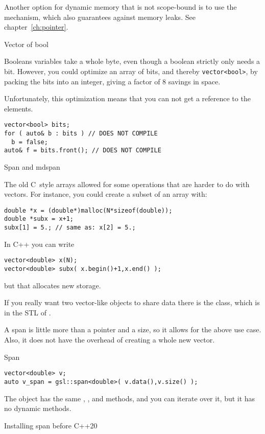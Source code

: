 Another option for dynamic memory that is not scope-bound
is to use the  mechanism,
which also guarantees against memory leaks. See chapter~\ref{ch:pointer}.

 {Vector of bool}

Booleans variables take a whole byte, even though
a boolean strictly only needs a bit.
However, you could optimize an array of bits,
and thereby \lstinline+vector<bool>+,
by packing the bits into an integer,
giving a factor of 8 savings in space.

Unfortunately, this optimization means that you can not
get a reference to the elements.
\begin{lstlisting}
vector<bool> bits;
for ( auto& b : bits ) // DOES NOT COMPILE
  b = false;
auto& f = bits.front(); // DOES NOT COMPILE
\end{lstlisting}

 {Span and mdspan}
\label{sec:gsl-span}

The old C~style arrays allowed for some operations that are harder to
do with vectors. For instance, you could create a subset of an array with:
\begin{lstlisting}
double *x = (double*)malloc(N*sizeof(double));
double *subx = x+1;
subx[1] = 5.; // same as: x[2] = 5.;
\end{lstlisting}
In C++ you can write
\begin{lstlisting}
vector<double> x(N);
vector<double> subx( x.begin()+1,x.end() );
\end{lstlisting}
but that allocates new storage.

If you really want two vector-like objects to share data there is the
 class, which is in the \ac{STL} of .

A span is little more than a pointer and a size, so it allows for the
above use case. Also, it does not have the overhead of creating a
whole new vector.

\begin{block}{Span}
  \label{sl:spandef}
\begin{lstlisting}
vector<double> v;
auto v_span = gsl::span<double>( v.data(),v.size() );
\end{lstlisting}
The  object has the same , , and
 methods, and you can iterate over it, but it has no
dynamic methods.
\end{block}

 {Installing span before C++20}

